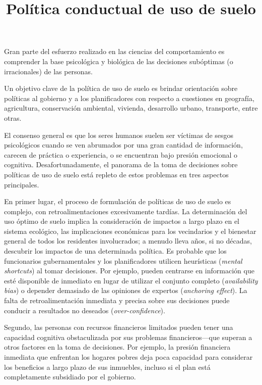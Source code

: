 \documentclass[cm,linguex]{glossa}
\title[Economía de la conducta]{Política conductual de uso de suelo}
\author[Carlos Lezama]{
    \spauthor{Carlos Enrique Lezama Jacinto\\
  \institute{\hfill\break
Instituto Tecnológico\\
Autónomo de México}\\
  \small{\hfill\break
clezamaj@itam.mx}
  }%
  }
\begin{document}
\sffamily
\maketitle



\rmfamily

Gran parte del esfuerzo realizado en las ciencias del comportamiento es
comprender la base psicológica y biológica de las decisiones subóptimas
(o irracionales) de las personas.

Un objetivo clave de la política de uso de suelo es brindar orientación
sobre políticas al gobierno y a los planificadores con respecto a
cuestiones en geografía, agricultura, conservación ambiental, vivienda,
desarrollo urbano, transporte, entre otras.

El consenso general es que los seres humanos suelen ser víctimas de
sesgos psicológicos cuando se ven abrumados por una gran cantidad de
información, carecen de práctica o experiencia, o se encuentran bajo
presión emocional o cognitiva. Desafortunadamente, el panorama de la
toma de decisiones sobre políticas de uso de suelo está repleto de estos
problemas en tres aspectos principales.

En primer lugar, el proceso de formulación de políticas de uso de suelo
es complejo, con retroalimentaciones excesivamente tardías. La
determinación del uso óptimo de suelo implica la consideración de
impactos a largo plazo en el sistema ecológico, las implicaciones
económicas para los vecindarios y el bienestar general de todos los
residentes involucrados; a menudo lleva años, si no décadas, descubrir
los impactos de una determinada política. Es probable que los
funcionarios gubernamentales y los planificadores utilicen heurísticas
(\emph{mental shortcuts}) al tomar decisiones. Por ejemplo, pueden
centrarse en información que esté disponible de inmediato en lugar de
utilizar el conjunto completo (\emph{availability bias}) o depender
demasiado de las opiniones de expertos (\emph{anchoring effect}). La
falta de retroalimentación inmediata y precisa sobre sus decisiones
puede conducir a resultados no deseados (\emph{over-confidence}).

Segundo, las personas con recursos financieros limitados pueden tener
una capacidad cognitiva obstaculizada por sus problemas
financieros---que superan a otros factores en la toma de decisiones. Por
ejemplo, la presión financiera inmediata que enfrentan los hogares
pobres deja poca capacidad para considerar los beneficios a largo plazo
de sus inmuebles, incluso si el plan está completamente subsidiado por
el gobierno.
\end{document}
